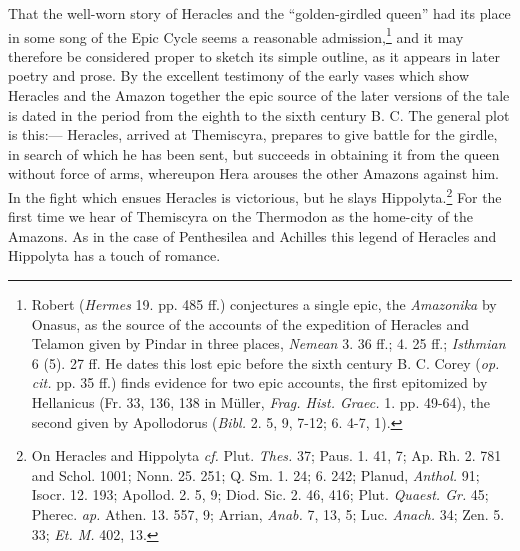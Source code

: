 \documentclass[a4paper, 12pt, oneside]{article}
\begin{document}
That the well-worn story of Heracles and the ``golden-girdled queen'' had its place in some song of the Epic Cycle seems a reasonable admission,\footnote{Robert (\emph{Hermes} 19. pp. 485 ff.) conjectures a single epic, the \emph{Amazonika} by Onasus, as the source of the accounts of the expedition of Heracles and Telamon given by Pindar in three places, \emph{Nemean} 3. 36 ff.; 4. 25 ff.; \emph{Isthmian} 6 (5). 27 ff. He dates this lost epic before the sixth century B. C. Corey (\emph{op. cit.} pp. 35 ff.) finds evidence for two epic accounts, the first epitomized by Hellanicus (Fr. 33, 136, 138 in Müller, \emph{Frag. Hist. Graec.} 1. pp. 49-64), the second given by Apollodorus (\emph{Bibl.} 2. 5, 9, 7-12; 6. 4-7, 1).} and it may therefore be considered proper to sketch its simple outline, as it appears in later poetry and prose. By the excellent testimony of the early vases which show Heracles and the Amazon together the epic source of the later versions of the tale is dated in the period from the eighth to the sixth century B. C. The general plot is this:--- Heracles, arrived at Themiscyra, prepares to give battle for the girdle, in search of which he has been sent, but succeeds in obtaining it from the queen without force of arms, whereupon Hera arouses the other Amazons against him. In the fight which ensues Heracles is victorious, but he slays Hippolyta.\footnote{On Heracles and Hippolyta \emph{cf.} Plut. \emph{Thes.} 37; Paus. 1. 41, 7; Ap. Rh. 2. 781 and Schol. 1001; Nonn. 25. 251; Q. Sm. 1. 24; 6. 242; Planud, \emph{Anthol.} 91; Isocr. 12. 193; Apollod. 2. 5, 9; Diod. Sic. 2. 46, 416; Plut. \emph{Quaest. Gr.} 45; Pherec. \emph{ap.} Athen. 13. 557, 9; Arrian, \emph{Anab.} 7, 13, 5; Luc. \emph{Anach.} 34; Zen. 5. 33; \emph{Et. M.} 402, 13.} For the first time we hear of Themiscyra on the Thermodon as the home-city of the Amazons. As in the case of Penthesilea and Achilles this legend of Heracles and Hippolyta has a touch of romance.
\end{document}
